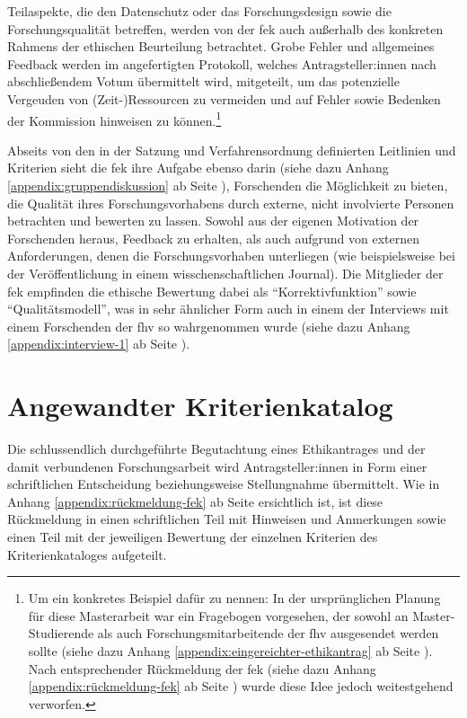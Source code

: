 \documentclass[a4paper,12pt,twoside]{scrreprt}
\begin{document}
Teilaspekte, die den Datenschutz oder das Forschungsdesign sowie die Forschungsqualität betreffen, werden von der \ac{fek} auch außerhalb des konkreten Rahmens der ethischen Beurteilung betrachtet. Grobe Fehler und allgemeines Feedback werden im angefertigten Protokoll, welches Antragsteller:innen nach abschließendem Votum übermittelt wird, mitgeteilt, um das potenzielle Vergeuden von (Zeit-)Ressourcen zu vermeiden und auf Fehler sowie Bedenken der Kommission hinweisen zu können.\footnote{Um ein konkretes Beispiel dafür zu nennen: In der ursprünglichen Planung für diese Masterarbeit war ein Fragebogen vorgesehen, der sowohl an Master-Studierende als auch Forschungsmitarbeitende der \ac{fhv} ausgesendet werden sollte (siehe dazu Anhang \ref{appendix:eingereichter-ethikantrag} ab Seite \pageref{appendix:eingereichter-ethikantrag}). Nach entsprechender Rückmeldung der \ac{fek} (siehe dazu Anhang \ref{appendix:rückmeldung-fek} ab Seite \pageref{appendix:rückmeldung-fek}) wurde diese Idee jedoch weitestgehend verworfen.\label{footnote:ursprüngliche-planung-leitfaden}} \cite[1\psq]{forschungsethik-kommission_der_fachhochschule_vorarlberg_verfahrensordnung_2020}

\medskip

Abseits von den in der Satzung und Verfahrensordnung definierten Leitlinien und Kriterien sieht die \ac{fek} ihre Aufgabe ebenso darin (siehe dazu Anhang \ref{appendix:gruppendiskussion} ab Seite \pageref{appendix:gruppendiskussion}), Forschenden die Möglichkeit zu bieten, die Qualität ihres Forschungsvorhabens durch externe, nicht involvierte Personen betrachten und bewerten zu lassen. Sowohl aus der eigenen Motivation der Forschenden heraus, Feedback zu erhalten, als auch aufgrund von externen Anforderungen, denen die Forschungsvorhaben unterliegen (wie beispielsweise bei der Veröffentlichung in einem wisschenschaftlichen Journal). Die Mitglieder der \ac{fek} empfinden die ethische Bewertung dabei als \enquote{Korrektivfunktion} sowie \enquote{Qualitätsmodell}, was in sehr ähnlicher Form auch in einem der Interviews mit einem Forschenden der \ac{fhv} so wahrgenommen wurde (siehe dazu Anhang \ref{appendix:interview-1} ab Seite \pageref{appendix:interview-1}).

\section{Angewandter Kriterienkatalog}
\label{sec:angewandter-kriterienkatalog}

Die schlussendlich durchgeführte Begutachtung eines Ethikantrages und der damit verbundenen Forschungsarbeit wird Antragsteller:innen in Form einer schriftlichen Entscheidung beziehungsweise Stellungnahme übermittelt. \cite[4]{forschungsethik-kommission_der_fachhochschule_vorarlberg_verfahrensordnung_2020} Wie in Anhang \ref{appendix:rückmeldung-fek} ab Seite \pageref{appendix:rückmeldung-fek} ersichtlich ist, ist diese Rückmeldung in einen schriftlichen Teil mit Hinweisen und Anmerkungen sowie einen Teil mit der jeweiligen Bewertung der einzelnen Kriterien des Kriterienkataloges aufgeteilt.
\end{document}
